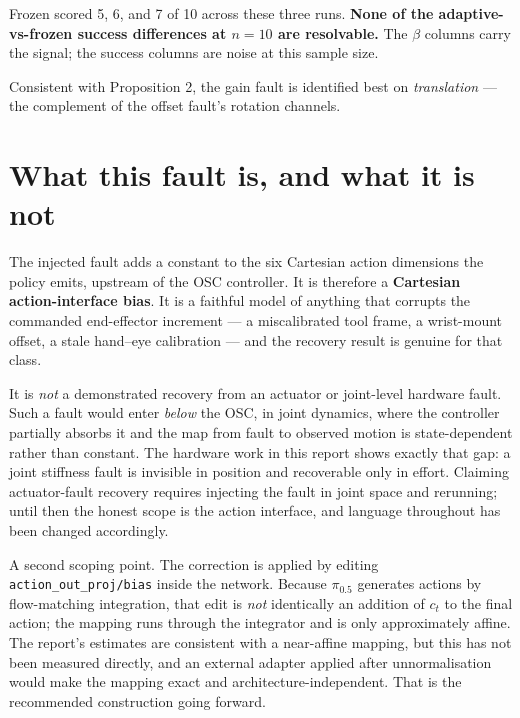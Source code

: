 \documentclass[11pt,a4paper]{article}
\newcommand{\code}[1]{\texttt{\small #1}}
\begin{document}
\begin{tcolorbox}[colback=orange!5,colframe=orange!55!black,title=\textbf{Honest reading}]
Frozen scored 5, 6, and 7 of 10 across these three runs. \textbf{None of the
adaptive-vs-frozen success differences at $n{=}10$ are resolvable.} The $\beta$
columns carry the signal; the success columns are noise at this sample size.
\end{tcolorbox}

Consistent with Proposition 2, the gain fault is identified best on
\emph{translation} --- the complement of the offset fault's rotation channels.

\section{What this fault is, and what it is not}
\label{sec:whatfault}

The injected fault adds a constant to the six Cartesian action dimensions the policy
emits, upstream of the OSC controller. It is therefore a \textbf{Cartesian
action-interface bias}. It is a faithful model of anything that corrupts the commanded
end-effector increment --- a miscalibrated tool frame, a wrist-mount offset, a stale
hand--eye calibration --- and the recovery result is genuine for that class.

It is \emph{not} a demonstrated recovery from an actuator or joint-level hardware fault.
Such a fault would enter \emph{below} the OSC, in joint dynamics, where the controller
partially absorbs it and the map from fault to observed motion is state-dependent rather
than constant. The hardware work in this report shows exactly that gap: a joint stiffness
fault is invisible in position and recoverable only in effort. Claiming actuator-fault
recovery requires injecting the fault in joint space and rerunning; until then the honest
scope is the action interface, and language throughout has been changed accordingly.

A second scoping point. The correction is applied by editing \code{action\_out\_proj/bias}
inside the network. Because $\pi_{0.5}$ generates actions by flow-matching integration,
that edit is \emph{not} identically an addition of $c_t$ to the final action; the mapping
runs through the integrator and is only approximately affine. The report's estimates are
consistent with a near-affine mapping, but this has not been measured directly, and an
external adapter applied after unnormalisation would make the mapping exact and
architecture-independent. That is the recommended construction going forward.
\end{document}

